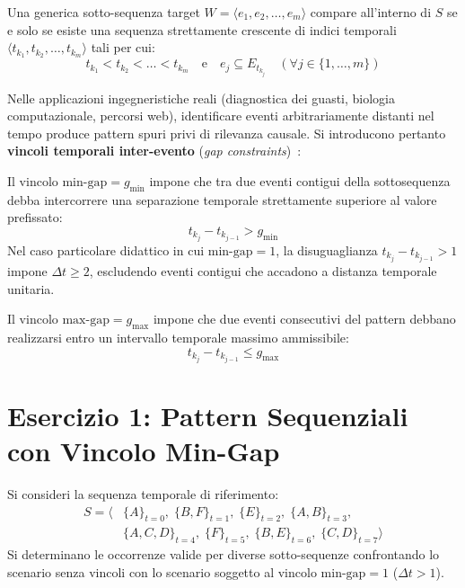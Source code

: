 Una generica sotto-sequenza target $W = \langle e_1, e_2, \dots, e_m \rangle$ compare all'interno di $S$ se e solo se esiste una sequenza strettamente crescente di indici temporali $\langle t_{k_1}, t_{k_2}, \dots, t_{k_m} \rangle$ tali per cui:
\begin{equation}
t_{k_1} < t_{k_2} < \dots < t_{k_m} \quad \text{e} \quad e_j \subseteq E_{t_{k_j}} \quad (\forall j \in \{1, \dots, m\})
\end{equation}

Nelle applicazioni ingegneristiche reali (diagnostica dei guasti, biologia computazionale, percorsi web), identificare eventi arbitrariamente distanti nel tempo produce pattern spuri privi di rilevanza causale. Si introducono pertanto \textbf{vincoli temporali inter-evento} (\textit{gap constraints})~\cite{srikant1996}:
\begin{definition}
Il vincolo $\text{min-gap} = g_{\min}$ impone che tra due eventi contigui della sottosequenza debba intercorrere una separazione temporale strettamente superiore al valore prefissato:
\begin{equation}
t_{k_j} - t_{k_{j-1}} > g_{\min}
\end{equation}
Nel caso particolare didattico in cui $\text{min-gap} = 1$, la disuguaglianza $t_{k_j} - t_{k_{j-1}} > 1$ impone $\Delta t \ge 2$, escludendo eventi contigui che accadono a distanza temporale unitaria.
\end{definition}

\begin{definition}
Il vincolo $\text{max-gap} = g_{\max}$ impone che due eventi consecutivi del pattern debbano realizzarsi entro un intervallo temporale massimo ammissibile:
\begin{equation}
t_{k_j} - t_{k_{j-1}} \le g_{\max}
\end{equation}
\end{definition}

\FloatBarrier
\section{Esercizio 1: Pattern Sequenziali con Vincolo Min-Gap}
\label{sec:dm-seq-min-gap-exercise}

Si consideri la sequenza temporale di riferimento:
\begin{align}
S = \big\langle &\{A\}_{t=0}, \; \{B, F\}_{t=1}, \; \{E\}_{t=2}, \; \{A, B\}_{t=3}, \nonumber \\
&\{A, C, D\}_{t=4}, \; \{F\}_{t=5}, \; \{B, E\}_{t=6}, \; \{C, D\}_{t=7} \big\rangle
\end{align}
Si determinano le occorrenze valide per diverse sotto-sequenze confrontando lo scenario senza vincoli con lo scenario soggetto al vincolo $\text{min-gap} = 1$ ($\Delta t > 1$).

